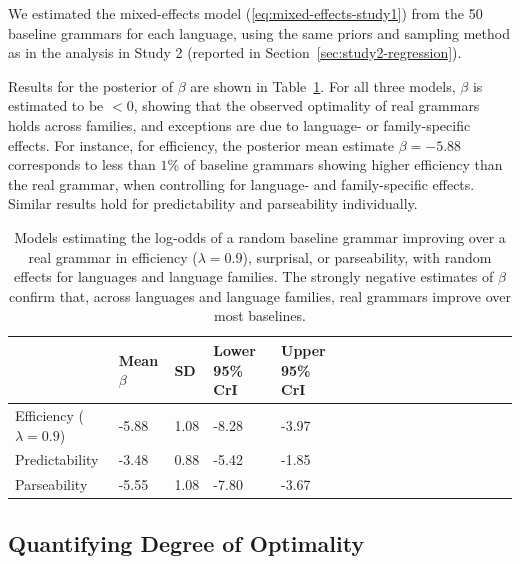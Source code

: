 \documentclass[10pt,twoside,lineno]{article}
\begin{document}
We estimated the mixed-effects model (\ref{eq:mixed-effects-study1}) from the 50 baseline grammars for each language, using the same priors and sampling method as in the analysis in Study 2 (reported in Section~\ref{sec:study2-regression}).

Results for the posterior of $\beta$ are shown in Table~\ref{tab:study1-glmer}.
For all three models, $\beta$ is estimated to be $< 0$, showing that the observed optimality of real grammars holds across families, and exceptions are due to language- or family-specific effects.
For instance, for efficiency, the posterior mean estimate $\beta=-5.88$ corresponds to  less than $1\%$ of baseline grammars showing higher efficiency than the real grammar, when controlling for language- and family-specific effects.
Similar results hold for predictability and parseability individually.


\begin{table}
\small{
\begin{center}
\begin{tabular}{|l||l|lll|llll|ll|llllll}
\hline
	& Mean $\beta$ & SD & Lower 95\% CrI & Upper 95\% CrI \\
\hline\hline
	Efficiency ($\lambda=0.9$) &	-5.88   &   1.08  &  -8.28  &  -3.97  \\
	Predictability & -3.48   &   0.88  &  -5.42  &  -1.85   \\
	Parseability & -5.55   &   1.08  &  -7.80  &  -3.67    \\
\hline
\end{tabular}
\end{center}
}
	\caption{Models estimating the log-odds of a random baseline grammar improving over a real grammar in efficiency ($\lambda=0.9$), surprisal, or parseability, with random effects for languages and language families. The strongly negative estimates of $\beta$ confirm that, across languages and language families, real grammars improve over most baselines.}\label{tab:study1-glmer}
\end{table}

\subsection{Quantifying Degree of Optimality}

%
\end{document}

